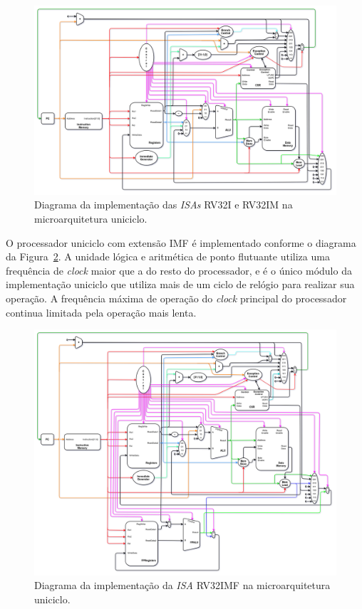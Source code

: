         \begin{figure}[H]
        \centering
            \includegraphics[width=1\linewidth]{../images/uarch_diagrams/singlecycle-RV32I-RV32IM.png}
            \caption{Diagrama da implementação das \textit{ISAs} RV32I e RV32IM na
            microarquitetura uniciclo.}\label{fig:diagram_rv32i_uni}
        \end{figure}

        { O processador uniciclo com extensão IMF é implementado conforme o
            diagrama da Figura~\ref{fig:diagram_rv32imf_uni}. A unidade lógica e
            aritmética de ponto flutuante utiliza uma frequência de \textit{clock}
            maior que a do resto do processador, e é o único módulo da implementação
            uniciclo que utiliza mais de um ciclo de relógio para realizar sua
            operação. A frequência máxima de operação do \textit{clock} principal
            do processador continua limitada pela operação mais lenta.
        }

        \begin{figure}[H]
        \centering
            \includegraphics[width=1\linewidth]{../images/uarch_diagrams/singlecycle-RV32IMF.png}
            \caption{Diagrama da implementação da \textit{ISA} RV32IMF na
            microarquitetura uniciclo.}\label{fig:diagram_rv32imf_uni}
        \end{figure}

